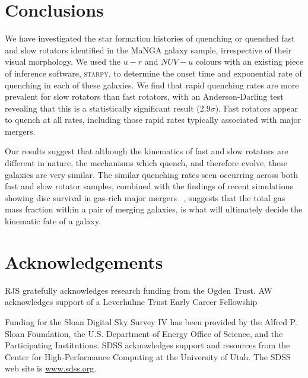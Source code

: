 \documentclass[useAMS,usenatbib]{mn2e}
\begin{document}
\section{Conclusions}

We have investigated the star formation histories of quenching or quenched fast and slow rotators identified in the MaNGA galaxy sample, irrespective of their visual morphology. We used the $u-r$ and $NUV-u$ colours with an existing piece of inference software, \textsc{starpy}, to determine the onset time and exponential rate of quenching in each of these galaxies. We find that rapid quenching rates are more prevalent for slow rotators than fast rotators, with an Anderson-Darling test revealing that this is a statistically significant result ($2.9\sigma$). Fast rotators appear to quench at all rates, including those rapid rates typically associated with major mergers.   

Our results suggest that although the kinematics of fast and slow rotators are different in nature, the mechanisms which quench, and therefore evolve, these galaxies are very similar. The similar quenching rates seen occurring across both fast and slow rotator samples, combined with the findings of recent simulations showing disc survival in gas-rich major mergers ~\citep{bois11, pontzen16, sparre16}, suggests that the total gas mass fraction within a pair of merging galaxies, is what will ultimately decide the kinematic fate of a galaxy. 

\section*{Acknowledgements}

RJS gratefully acknowledges research funding from the Ogden Trust. AW acknowledges support of a Leverhulme Trust Early Career Fellowship

Funding for the Sloan Digital Sky Survey IV has been provided by the
Alfred P. Sloan Foundation, the U.S. Department of Energy Office of
Science, and the Participating Institutions. SDSS acknowledges
support and resources from the Center for High-Performance Computing at the University of Utah. The SDSS web site is \url{www.sdss.org}.
\end{document}
